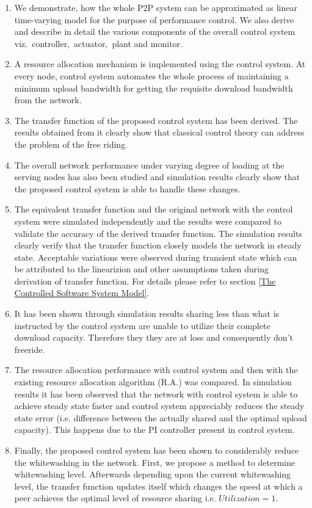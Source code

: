\documentclass[journal]{IEEEtran}
\begin{document}
\begin{enumerate}
	\item We demonstrate, how the whole P2P system can be approximated as linear time-varying model for the purpose of performance control. We also derive and describe in detail the various components of the overall control system viz.~controller,~actuator,~plant and monitor.
	\item  A resource allocation mechanism  is implemented using the control system.  At every node, control system automates the whole process of maintaining a minimum upload bandwidth for getting the requisite download bandwidth from the network.
	\item The transfer function of the proposed control system has been derived. The results obtained from it clearly show that classical control theory can address the problem of the free riding. 
	\item The overall network performance under varying degree of loading at the serving nodes has also been studied and simulation results clearly show that the proposed control system is able to handle these changes.
	\item The equivalent transfer function and the original network with the control system were simulated independently and the results were compared to validate the accuracy of the derived transfer function. The simulation results clearly verify that the transfer function closely models the network in steady state. Acceptable variations were observed during transient state which can be attributed to the linearizion \cite{Ogata} and other assumptions taken during derivation of transfer function. For details please refer to section \ref{The Controlled Software System Model}.
	\item It has been shown through simulation results sharing less than what is instructed by the control system are unable to utilize their complete download capacity. Therefore they they are at loss and consequently don't freeride.
	\item The resource allocation performance with control system  and then  with the existing resource allocation algorithm (R.A.) \cite{Satsiou} was compared. In simulation results it has been observed that the network with control system is able to achieve steady state faster and control system appreciably reduces the steady state error (i.e. difference between the actually shared and the optimal upload capacity). This happens due to the PI controller present in control system.
\item Finally, the proposed control system has been shown to considerably reduce the whitewashing in the network. First, we propose a method to determine whitewashing level. Afterwards depending upon the current whitewashing level, the transfer function updates itself which changes the speed at which a peer achieves the optimal level of resource sharing i.e. $Utilization =1$.
\end{enumerate}
\end{document}
